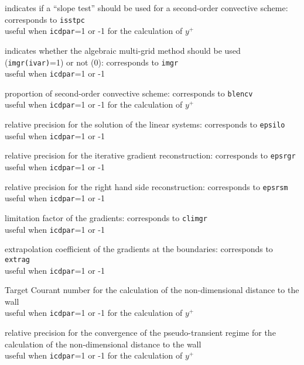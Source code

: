 {indicates if a ``slope test'' should be used for a second-order convective
scheme: corresponds to {\tt isstpc}\\
useful when {\tt icdpar}=1 or -1 for the calculation of $y^+$}

{indicates whether the algebraic
multi-grid method should be used ({\tt imgr(ivar)}=1) or not (0): corresponds
to {\tt imgr}\\
useful when {\tt icdpar}=1 or -1}

{proportion of second-order convective scheme: corresponds to {\tt blencv}\\
useful when {\tt icdpar}=1 or -1 for the calculation of $y^+$}

{relative precision for the solution of the linear systems:
corresponds to {\tt epsilo}\\
useful when {\tt icdpar}=1 or -1}

{relative precision for the iterative gradient reconstruction:
corresponds to {\tt epsrgr}\\
useful when {\tt icdpar}=1 or -1}

{relative precision for the right hand side reconstruction:
corresponds to {\tt epsrsm}\\
useful when {\tt icdpar}=1 or -1}

{limitation factor of the gradients: corresponds to {\tt climgr}\\
useful when {\tt icdpar}=1 or -1}

{extrapolation coefficient of the gradients at the boundaries:
corresponds to {\tt extrag}\\
useful when {\tt icdpar}=1 or -1}

{Target Courant number for the calculation of the non-dimensional distance
to the wall\\
useful when {\tt icdpar}=1 or -1 for the calculation of $y^+$}

{relative precision for the convergence of the pseudo-transient regime
for the calculation of the non-dimensional distance to the wall\\
useful when {\tt icdpar}=1 or -1  for the calculation of $y^+$}

